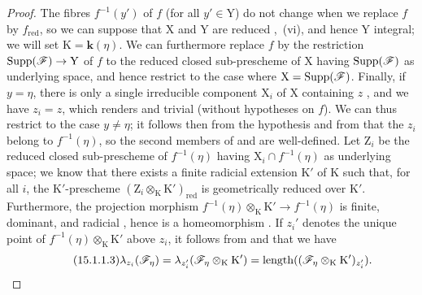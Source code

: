 \begin{proof}
\label{IV.15.1.1-proof}
The fibres $f^{-1}(y')$ of $f$ (for all $y'\in\mathrm{Y}$) do not change when we replace $f$ by $f_\mathrm{red}$, so we can suppose that $\mathrm{X}$ and $\mathrm{Y}$ are reduced ,~(vi), and hence $\mathrm{Y}$ integral; we will set $\mathrm{K}=\mathbf{k}(\eta)$.
We can furthermore replace $f$ by the restriction $\operatorname{Supp}(\mathscr{F})\to\mathrm{Y}$ of $f$ to the reduced closed sub-prescheme of $\mathrm{X}$ having $\operatorname{Supp}(\mathscr{F})$ as underlying space, and hence restrict to the case where $\mathrm{X}=\operatorname{Supp}(\mathscr{F})$.
Finally, if $y=\eta$, there is only a single irreducible component $\mathrm{X}_i$ of $\mathrm{X}$ containing $z$ , and we have $z_i=z$, which renders  and  trivial (without hypotheses on $f$).
We can thus restrict to the case $y\neq\eta$; it follows then from the hypothesis and from  that the $z_i$ belong to $f^{-1}(\eta)$, so the second members of  and  are well-defined.
Let $\mathrm{Z}_i$ be the reduced closed sub-prescheme of $f^{-1}(\eta)$ having $\mathrm{X}_i\cap f^{-1}(\eta)$ as underlying space; we know  that there exists a finite radicial extension $\mathrm{K}'$ of $\mathrm{K}$ such that, for all $i$, the $\mathrm{K}'$-prescheme $(\mathrm{Z}_i\otimes_\mathrm{K}\mathrm{K}')_\mathrm{red}$ is geometrically reduced over $\mathrm{K}'$.
Furthermore, the projection morphism $f^{-1}(\eta)\otimes_\mathrm{K}\mathrm{K}'\to f^{-1}(\eta)$ is finite, dominant, and radicial , hence is a homeomorphism .
If $z_i'$ denotes the unique point of $f^{-1}(\eta)\otimes_\mathrm{K}\mathrm{K}'$ above $z_i$, it follows from  and  that we have
\[
\tag{15.1.1.3}
\label{IV.15.1.1.3}
  \lambda_{z_i}(\mathscr{F}_\eta)=\lambda_{z_i'}(\mathscr{F}_\eta\otimes_\mathrm{K}\mathrm{K}')=\operatorname{length}((\mathscr{F}_\eta\otimes_\mathrm{K}\mathrm{K}')_{z_i'}).
\]


\end{proof}
